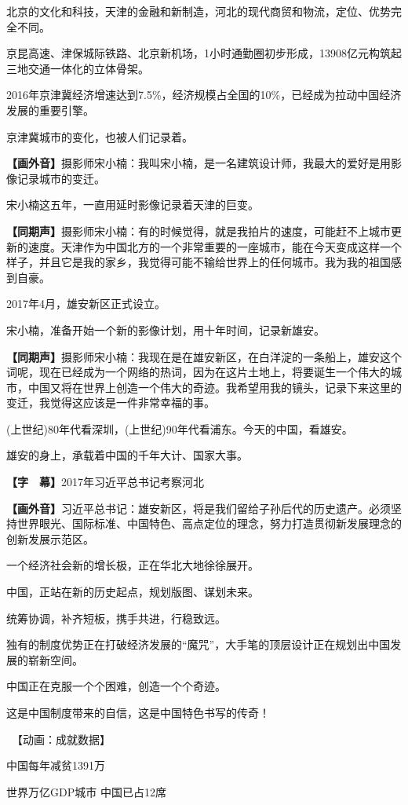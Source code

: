 \documentclass{ctexart}
\newcommand{\zkh}[1]{\textbf{\hspace{-2.7em} 【#1】}}
\begin{document}
北京的文化和科技，天津的金融和新制造，河北的现代商贸和物流，定位、优势完全不同。

京昆高速、津保城际铁路、北京新机场，1小时通勤圈初步形成，13908亿元构筑起三地交通一体化的立体骨架。

2016年京津冀经济增速达到7.5{\%}，经济规模占全国的10{\%}，已经成为拉动中国经济发展的重要引擎。

京津冀城市的变化，也被人们记录着。

\zkh{画外音}摄影师宋小楠：我叫宋小楠，是一名建筑设计师，我最大的爱好是用影像记录城市的变迁。

宋小楠这五年，一直用延时影像记录着天津的巨变。

\zkh{同期声}摄影师宋小楠：有的时候觉得，就是我拍片的速度，可能赶不上城市更新的速度。天津作为中国北方的一个非常重要的一座城市，能在今天变成这样一个样子，并且它是我的家乡，我觉得可能不输给世界上的任何城市。我为我的祖国感到自豪。

2017年4月，雄安新区正式设立。

宋小楠，准备开始一个新的影像计划，用十年时间，记录新雄安。

\zkh{同期声}摄影师宋小楠：我现在是在雄安新区，在白洋淀的一条船上，雄安这个词呢，现在已经成为一个网络的热词，因为在这片土地上，将要诞生一个伟大的城市，中国又将在世界上创造一个伟大的奇迹。我希望用我的镜头，记录下来这里的变迁，我觉得这应该是一件非常幸福的事。

(上世纪)80年代看深圳，(上世纪)90年代看浦东。今天的中国，看雄安。

雄安的身上，承载着中国的千年大计、国家大事。

\zkh{字　幕}2017年习近平总书记考察河北

\zkh{画外音}习近平总书记：雄安新区，将是我们留给子孙后代的历史遗产。必须坚持世界眼光、国际标准、中国特色、高点定位的理念，努力打造贯彻新发展理念的创新发展示范区。

一个经济社会新的增长极，正在华北大地徐徐展开。

中国，正站在新的历史起点，规划版图、谋划未来。

统筹协调，补齐短板，携手共进，行稳致远。

独有的制度优势正在打破经济发展的``魔咒''，大手笔的顶层设计正在规划出中国发展的崭新空间。

中国正在克服一个个困难，创造一个个奇迹。

这是中国制度带来的自信，这是中国特色书写的传奇！

　【动画：成就数据】

中国每年减贫1391万

世界万亿GDP城市 中国已占12席
\end{document}
